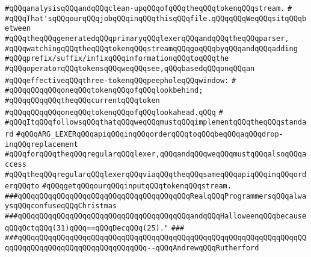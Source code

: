 \verb|#qQQqanalysisqQQqandqQQqclean-upqQQqofqQQqtheqQQqtokenqQQqstream.|\newline
\verb|#|\newline
\verb|#qQQqThat'sqQQqourqQQqjobqQQqinqQQqthisqQQqfile.qQQqqQQqWeqQQqsitqQQqbetween|\newline
\verb|#qQQqtheqQQqgeneratedqQQqprimaryqQQqlexerqQQqandqQQqtheqQQqparser,|\newline
\verb|#qQQqwatchingqQQqtheqQQqtokenqQQqstreamqQQqgoqQQqbyqQQqandqQQqadding|\newline
\verb|#qQQqprefix/suffix/infixqQQqinformationqQQqtoqQQqthe|\newline
\verb|#qQQqoperatorqQQqtokensqQQqweqQQqsee,qQQqbasedqQQqonqQQqan|\newline
\verb|#qQQqeffectiveqQQqthree-tokenqQQqpeepholeqQQqwindow:|\newline
\verb|#|\newline
\verb|#qQQqqQQqqQQqoneqQQqtokenqQQqofqQQqlookbehind;|\newline
\verb|#qQQqqQQqqQQqtheqQQqcurrentqQQqtoken|\newline
\verb|#qQQqqQQqqQQqoneqQQqtokenqQQqofqQQqlookahead.qQQq|\newline
\verb|#|\newline
\verb|#qQQqItqQQqfollowsqQQqthatqQQqweqQQqmustqQQqimplementqQQqtheqQQqstandard|\newline
\verb|#qQQqARG_LEXERqQQqapiqQQqinqQQqorderqQQqtoqQQqbeqQQqaqQQqdrop-inqQQqreplacement|\newline
\verb|#qQQqforqQQqtheqQQqregularqQQqlexer,qQQqandqQQqweqQQqmustqQQqalsoqQQqaccess|\newline
\verb|#qQQqtheqQQqregularqQQqlexerqQQqviaqQQqtheqQQqsameqQQqapiqQQqinqQQqorderqQQqto|\newline
\verb|#qQQqgetqQQqourqQQqinputqQQqtokenqQQqstream.|\newline
\newline
\newline
\verb|###qQQqqQQqqQQqqQQqqQQqqQQqqQQqqQQqqQQqqQQqRealqQQqProgrammersqQQqalwaysqQQqconfuseqQQqChristmas|\newline
\verb|###qQQqqQQqqQQqqQQqqQQqqQQqqQQqqQQqqQQqqQQqandqQQqHalloweenqQQqbecauseqQQqOctqQQq(31)qQQq==qQQqDecqQQq(25)."|\newline
\verb|###|\newline
\verb|###qQQqqQQqqQQqqQQqqQQqqQQqqQQqqQQqqQQqqQQqqQQqqQQqqQQqqQQqqQQqqQQqqQQqqQQqqQQqqQQqqQQqqQQqqQQqqQQqqQQq--qQQqAndrewqQQqRutherford|\newline
\newline
